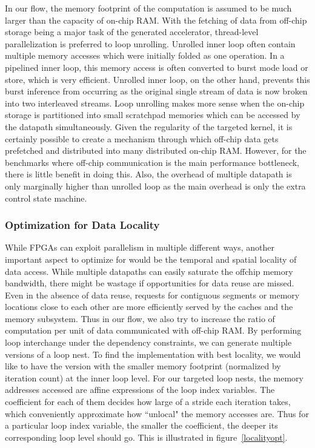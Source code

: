 In our flow, the memory footprint of the computation is assumed to be
much larger than the capacity of on-chip RAM. With the fetching of data
from off-chip storage being a major task of the generated accelerator,
thread-level parallelization is preferred to loop unrolling.
Unrolled inner loop often contain multiple memory accesses which were
initially folded as one operation. In a pipelined inner loop, this
memory access is often converted to burst mode load or store, which is
very efficient. Unrolled inner loop, on the other hand, prevents this burst
inference from occurring as the original single stream of data is now broken
into two interleaved streams.
Loop unrolling makes more sense when the on-chip storage is partitioned into small scratchpad memories which can be accessed by the datapath simultaneously.
Given the regularity of the targeted kernel, it is certainly possible to create a mechanism through which off-chip data gets prefetched and distributed into many distributed on-chip RAM. However, for the benchmarks where off-chip communication 
is the main performance bottleneck, there is little benefit in doing this. 
Also, the overhead of multiple datapath is only marginally higher than unrolled
loop as the main overhead is only the extra control state machine.  



\subsubsection{Optimization for Data Locality}
While FPGAs can exploit parallelism in 
multiple different ways, another important aspect to optimize for would be the temporal and spatial locality of data access. While multiple datapaths can
easily saturate the offchip memory bandwidth, there might be wastage if opportunities for data reuse are missed. 
Even in the absence of data reuse, requests for 
contiguous segments or memory locations close to each other are more efficiently served by the caches and the memory subsystem.
Thus in our flow, we also try to increase the ratio of computation per unit of data communicated with off-chip RAM. By performing loop interchange under the dependency constraints, we can generate multiple versions of a loop nest. To find the implementation with best locality, we would like to have the version with the smaller memory footprint (normalized by iteration count) at the inner loop level.
For our targeted loop nests, the memory addresses accessed are affine expressions of the loop index variables. The coefficient for each of them
decides how large of a stride each iteration takes, which conveniently
approximate how ``unlocal" the memory accesses are. 
Thus for a particular loop index variable, the smaller the coefficient, the deeper its corresponding loop level should go.
This is illustrated in figure~\ref{localityopt}. 



